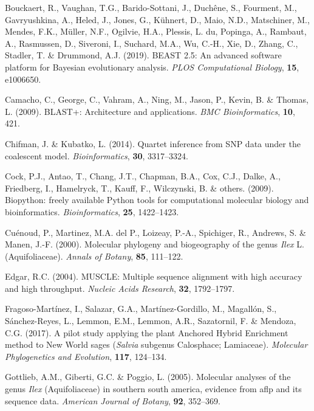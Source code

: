 \documentclass[]{article}
\begin{document}
\leavevmode\hypertarget{ref-bouckaert2019beast}{}%
Bouckaert, R., Vaughan, T.G., Barido-Sottani, J., Duchêne, S., Fourment, M., Gavryushkina, A., Heled, J., Jones, G., Kühnert, D., Maio, N.D., Matschiner, M., Mendes, F.K., Müller, N.F., Ogilvie, H.A., Plessis, L. du, Popinga, A., Rambaut, A., Rasmussen, D., Siveroni, I., Suchard, M.A., Wu, C.-H., Xie, D., Zhang, C., Stadler, T. \& Drummond, A.J. (2019). BEAST 2.5: An advanced software platform for Bayesian evolutionary analysis. \emph{PLOS Computational Biology}, \textbf{15}, e1006650.

\leavevmode\hypertarget{ref-camacho2009blast}{}%
Camacho, C., George, C., Vahram, A., Ning, M., Jason, P., Kevin, B. \& Thomas, L. (2009). BLAST+: Architecture and applications. \emph{BMC Bioinformatics}, \textbf{10}, 421.

\leavevmode\hypertarget{ref-chifman2014quartet}{}%
Chifman, J. \& Kubatko, L. (2014). Quartet inference from SNP data under the coalescent model. \emph{Bioinformatics}, \textbf{30}, 3317--3324.

\leavevmode\hypertarget{ref-cock2009biopython}{}%
Cock, P.J., Antao, T., Chang, J.T., Chapman, B.A., Cox, C.J., Dalke, A., Friedberg, I., Hamelryck, T., Kauff, F., Wilczynski, B. \& others. (2009). Biopython: freely available Python tools for computational molecular biology and bioinformatics. \emph{Bioinformatics}, \textbf{25}, 1422--1423.

\leavevmode\hypertarget{ref-cuenoud2000molecular}{}%
Cuénoud, P., Martinez, M.A. del P., Loizeay, P.-A., Spichiger, R., Andrews, S. \& Manen, J.-F. (2000). Molecular phylogeny and biogeography of the genus \emph{Ilex} L.(Aquifoliaceae). \emph{Annals of Botany}, \textbf{85}, 111--122.

\leavevmode\hypertarget{ref-edgar2004muscle}{}%
Edgar, R.C. (2004). MUSCLE: Multiple sequence alignment with high accuracy and high throughput. \emph{Nucleic Acids Research}, \textbf{32}, 1792--1797.

\leavevmode\hypertarget{ref-fragoso2017pilot}{}%
Fragoso-Martínez, I., Salazar, G.A., Martínez-Gordillo, M., Magallón, S., Sánchez-Reyes, L., Lemmon, E.M., Lemmon, A.R., Sazatornil, F. \& Mendoza, C.G. (2017). A pilot study applying the plant Anchored Hybrid Enrichment method to New World sages (\emph{Salvia} subgenus Calosphace; Lamiaceae). \emph{Molecular Phylogenetics and Evolution}, \textbf{117}, 124--134.

\leavevmode\hypertarget{ref-gottlieb2005molecular}{}%
Gottlieb, A.M., Giberti, G.C. \& Poggio, L. (2005). Molecular analyses of the genus \emph{Ilex} (Aquifoliaceae) in southern south america, evidence from aflp and its sequence data. \emph{American Journal of Botany}, \textbf{92}, 352--369.
\end{document}
